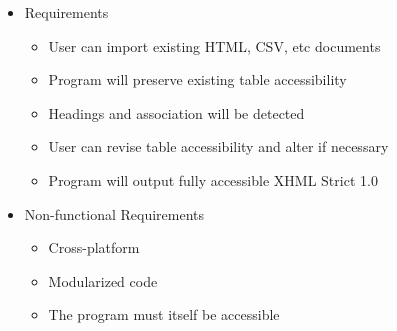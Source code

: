 \documentclass[landscape,20pt]{foils}
\newcommand{\jhead}[1]{\foilhead{\flushleft \textcolor{blue}{\large   #1}
\vspace{-1.9cm} 
\textcolor{blue}{\rule{25cm}{0.5mm}}
}}
\begin{document}

\begin{itemize}

\item Requirements

\begin{itemize}

\item User can import existing HTML, CSV, etc documents

\item Program will preserve existing table accessibility

\item Headings and association will be detected

\item User can revise table accessibility and alter if necessary

\item Program will output fully accessible XHML Strict 1.0

\end{itemize}

\item Non-functional Requirements

\begin{itemize}

\item Cross-platform

\item Modularized code

\item The program must itself be accessible

\end{itemize}

\end{itemize}




\jhead{Features}

\setcounter{page}{5}

\end{document}

